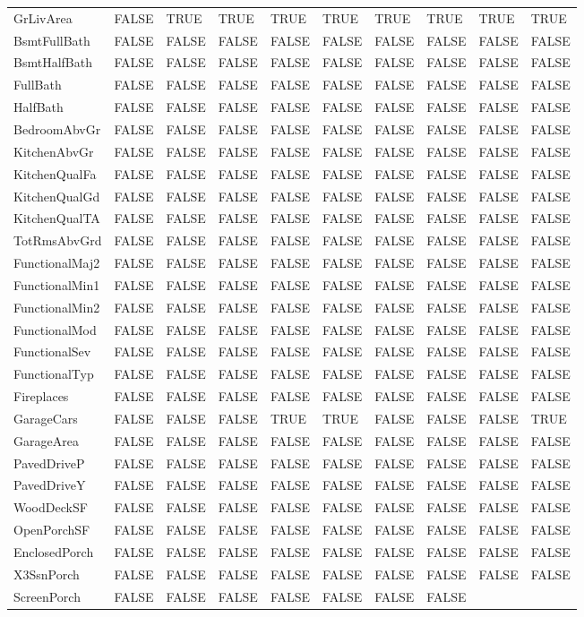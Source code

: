 \documentclass[]{article}
\begin{document}
\begin{longtable}[]{@{}llllllllll@{}}
GrLivArea & FALSE & TRUE & TRUE & TRUE & TRUE & TRUE & TRUE & TRUE &
TRUE\tabularnewline
BsmtFullBath & FALSE & FALSE & FALSE & FALSE & FALSE & FALSE & FALSE &
FALSE & FALSE\tabularnewline
BsmtHalfBath & FALSE & FALSE & FALSE & FALSE & FALSE & FALSE & FALSE &
FALSE & FALSE\tabularnewline
FullBath & FALSE & FALSE & FALSE & FALSE & FALSE & FALSE & FALSE & FALSE
& FALSE\tabularnewline
HalfBath & FALSE & FALSE & FALSE & FALSE & FALSE & FALSE & FALSE & FALSE
& FALSE\tabularnewline
BedroomAbvGr & FALSE & FALSE & FALSE & FALSE & FALSE & FALSE & FALSE &
FALSE & FALSE\tabularnewline
KitchenAbvGr & FALSE & FALSE & FALSE & FALSE & FALSE & FALSE & FALSE &
FALSE & FALSE\tabularnewline
KitchenQualFa & FALSE & FALSE & FALSE & FALSE & FALSE & FALSE & FALSE &
FALSE & FALSE\tabularnewline
KitchenQualGd & FALSE & FALSE & FALSE & FALSE & FALSE & FALSE & FALSE &
FALSE & FALSE\tabularnewline
KitchenQualTA & FALSE & FALSE & FALSE & FALSE & FALSE & FALSE & FALSE &
FALSE & FALSE\tabularnewline
TotRmsAbvGrd & FALSE & FALSE & FALSE & FALSE & FALSE & FALSE & FALSE &
FALSE & FALSE\tabularnewline
FunctionalMaj2 & FALSE & FALSE & FALSE & FALSE & FALSE & FALSE & FALSE &
FALSE & FALSE\tabularnewline
FunctionalMin1 & FALSE & FALSE & FALSE & FALSE & FALSE & FALSE & FALSE &
FALSE & FALSE\tabularnewline
FunctionalMin2 & FALSE & FALSE & FALSE & FALSE & FALSE & FALSE & FALSE &
FALSE & FALSE\tabularnewline
FunctionalMod & FALSE & FALSE & FALSE & FALSE & FALSE & FALSE & FALSE &
FALSE & FALSE\tabularnewline
FunctionalSev & FALSE & FALSE & FALSE & FALSE & FALSE & FALSE & FALSE &
FALSE & FALSE\tabularnewline
FunctionalTyp & FALSE & FALSE & FALSE & FALSE & FALSE & FALSE & FALSE &
FALSE & FALSE\tabularnewline
Fireplaces & FALSE & FALSE & FALSE & FALSE & FALSE & FALSE & FALSE &
FALSE & FALSE\tabularnewline
GarageCars & FALSE & FALSE & FALSE & TRUE & TRUE & FALSE & FALSE & FALSE
& TRUE\tabularnewline
GarageArea & FALSE & FALSE & FALSE & FALSE & FALSE & FALSE & FALSE &
FALSE & FALSE\tabularnewline
PavedDriveP & FALSE & FALSE & FALSE & FALSE & FALSE & FALSE & FALSE &
FALSE & FALSE\tabularnewline
PavedDriveY & FALSE & FALSE & FALSE & FALSE & FALSE & FALSE & FALSE &
FALSE & FALSE\tabularnewline
WoodDeckSF & FALSE & FALSE & FALSE & FALSE & FALSE & FALSE & FALSE &
FALSE & FALSE\tabularnewline
OpenPorchSF & FALSE & FALSE & FALSE & FALSE & FALSE & FALSE & FALSE &
FALSE & FALSE\tabularnewline
EnclosedPorch & FALSE & FALSE & FALSE & FALSE & FALSE & FALSE & FALSE &
FALSE & FALSE\tabularnewline
X3SsnPorch & FALSE & FALSE & FALSE & FALSE & FALSE & FALSE & FALSE &
FALSE & FALSE\tabularnewline
ScreenPorch & FALSE & FALSE & FALSE & FALSE & FALSE & FALSE & FALSE &

\end{longtable}
\end{document}
